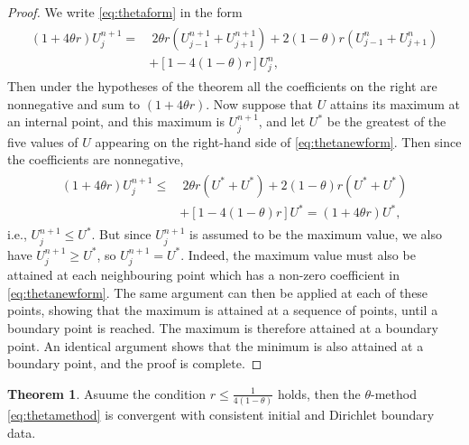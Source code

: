 \documentclass[a4paper,twoside]{ctexart}
\theoremstyle{definition}
\newtheorem{theorem}[definition]{Theorem}
\begin{document}
\begin{proof}
	We write \eqref{eq:thetaform} in the form
	\begin{eqnarray}
	\label{eq:thetanewform}
	\begin{aligned}
	 (1 + 4\theta r)U_{j}^{n+1} 
	=&\ 2\theta r (U_{j-1}^{n+1}+U_{j+1}^{n+1})+2(1-\theta)r(U_{j-1}^{n}+U_{j+1}^{n})\\
	&+[1-4(1-\theta)r]U_{j}^{n},
	\end{aligned}
	\end{eqnarray}
	Then under the hypotheses of the theorem all the coefficients on the right
	are nonnegative and sum to $(1 + 4\theta r)$. Now suppose that $U$ attains its maximum at an internal point, and this maximum is $U_j^{n+1}$, and let $U^*$ be the greatest of the five values of $U$ appearing on the right-hand side of \eqref{eq:thetanewform}. Then since the coefficients are nonnegative,
	\begin{eqnarray}
	\begin{aligned}
	(1 + 4\theta r)U_{j}^{n+1} 
	\le&\ 2\theta r (U^*+U^*)+2(1-\theta)r(U^*+U^*)\\
	&+[1-4(1-\theta)r]U^* = (1 + 4\theta r)U^*, 
	\end{aligned}
	\end{eqnarray}
	i.e., $U_{j}^{n+1} \le U^*$. But since
	$U_{j}^{n+1}$ is assumed to be the maximum value, we also have $U_{j}^{n+1} \ge U^*$, so $U_{j}^{n+1} = U^*$.  Indeed, the maximum value must also be attained at each
	neighbouring point which has a non-zero coefficient in \eqref{eq:thetanewform}. The same
	argument can then be applied at each of these points, showing that the
	maximum is attained at a sequence of points, until a boundary point
	is reached. The maximum is therefore attained at a boundary point.
	An identical argument shows that the minimum is also attained at a
	boundary point, and the proof is complete.
\end{proof}
\begin{theorem}
	Asuume the condition $r \le \frac{1}{4(1 − \theta)} $ holds, then the $\theta$-method \eqref{eq:thetamethod} is convergent with consistent initial and
	Dirichlet boundary data.
\end{theorem}
\end{document}
